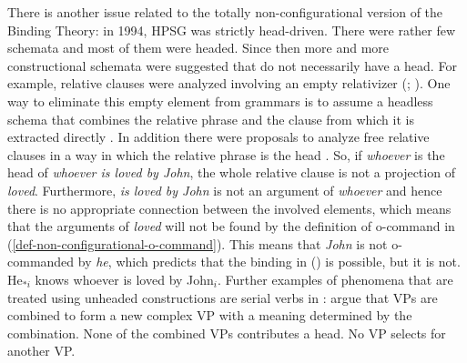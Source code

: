 \documentclass[output=paper
 	        ,biblatex
                ,babelshorthands
                ,newtxmath
                ,draftmode
                ,colorlinks, citecolor=brown
]{langscibook}
\begin{document}
There is another issue related to the totally non-configurational version of the Binding Theory: in 1994, HPSG was strictly
head-driven. There were rather few schemata and most of them were headed. Since then more and more
constructional schemata were suggested that do not necessarily have a head. For example, relative
clauses were analyzed involving an empty relativizer (\citealp[Chapter~5]{ps2}; ). One way to eliminate this empty element from
grammars is to assume a headless schema that combines the relative phrase and the clause from which
it is extracted directly \parencites[Section~2.7]{Mueller99b}[522]{Sag:10b}[]{MuellerCurrentApproaches}. In addition there were proposals to analyze free
relative clauses in a way in which the relative phrase is the head
\citep[]{WK2003a}. So, if \emph{whoever} is the head of \emph{whoever is loved by John}, the whole
relative clause is not a projection of \emph{loved}. Furthermore, \emph{is loved by John} is not an argument
of \emph{whoever} and hence there is no appropriate connection between the involved elements, which
means that the arguments of \emph{loved} will not be found by the definition of o-command in
(\ref{def-non-configurational-o-command}). This means that \emph{John} is not o-commanded by
\emph{he}, which predicts that the binding in () is possible, but it is not. 
\ea
He$_{*i}$ knows whoever is loved by John$_i$.
\z
Further examples of phenomena that are treated using unheaded constructions are serial verbs in
: \citet{ML2009a} argue that VPs are combined to form a new complex VP with a
meaning determined by the combination. None of the combined VPs contributes a head. No VP selects
for another VP. 

\end{document}
